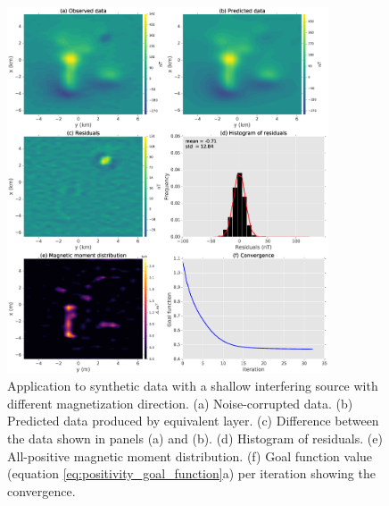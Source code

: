 \begin{figure}
	\centering
	\includegraphics[width=0.85\textwidth]{Fig/unidir_shallow_diff_test/results_compiled_LM_NNLS_magRM.eps}
	\caption{Application to synthetic data with a shallow interfering source with different magnetization direction. (a) Noise-corrupted data. (b) Predicted data produced by equivalent layer. (c) Difference between the data shown in panels (a) and (b). (d) Histogram of residuals. (e) All-positive magnetic moment distribution. (f) Goal function value (equation \ref{eq:positivity_goal_function}a) per iteration showing the convergence.}
	\label{fig:unidir_shallow_diff_test}
\end{figure}

